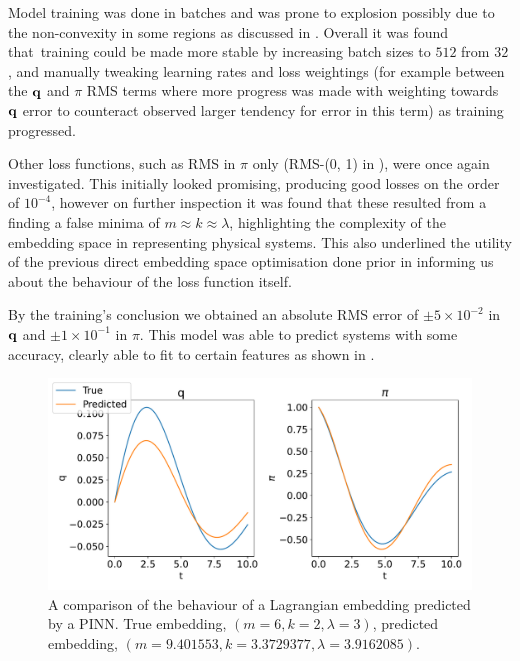 Model training was done in batches and was prone to explosion possibly due to the non-convexity in some regions as discussed in . Overall it was found that training could be made more stable by increasing batch sizes to $512$ from $32$, and manually tweaking learning rates and loss weightings (for example between the $\vb q$ and $\pi$ RMS terms where more progress was made with weighting towards $\vb{q}$ error to counteract observed larger tendency for error in this term) as training progressed.

Other loss functions, such as RMS in $\pi$ only (RMS-(0, 1) in ), were once again investigated. This initially looked promising, producing good losses on the order of $10^{-4}$, however on further inspection it was found that these resulted from a finding a false minima of $m \approx k \approx \lambda$, highlighting the complexity of the embedding space in representing physical systems. This also underlined the utility of the previous direct embedding space optimisation done prior in informing us about the behaviour of the loss function itself.

By the training's conclusion we obtained an absolute RMS error of $\pm 5 \times 10^{-2}$ in $\vb{q}$ and $\pm 1 \times 10 ^{-1}$ in $\pi$. This model was able to predict systems with some accuracy, clearly able to fit to certain features as shown in .

\begin{figure}[t]
  \includegraphics[width=\columnwidth]{figures/model-predictions.pdf}
  \caption{A comparison of the behaviour of a Lagrangian embedding predicted by a PINN. True embedding, $(m = 6, k = 2, \lambda = 3)$, predicted embedding, $(m = 9.401553,  k = 3.3729377, \lambda = 3.9162085)$.}
  \label{fig:model-prediction}
\end{figure}


